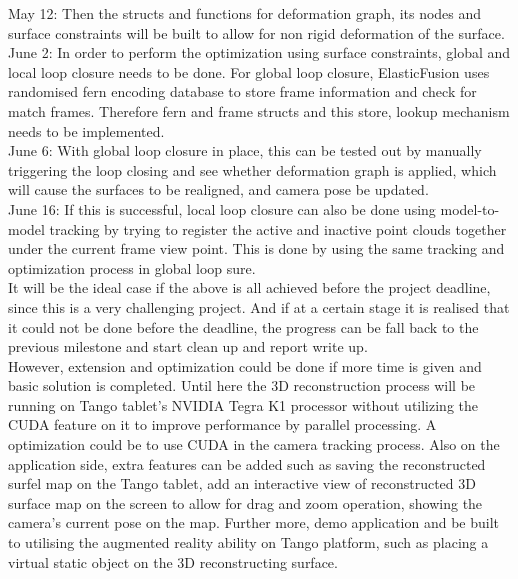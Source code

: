 \documentclass[12pt,twoside]{article}
\begin{document}
May 12: Then the structs and functions for deformation graph, its nodes and surface constraints will be built to allow for non rigid deformation of the surface.\\

June 2: In order to perform the optimization using surface constraints, global and local loop closure needs to be done. For global loop closure, ElasticFusion\cite{whelan2015elasticfusion} uses randomised fern encoding database to store frame information and check for match frames. Therefore fern and frame structs and this store, lookup mechanism needs to be implemented.\\

June 6: With global loop closure in place, this can be tested out by manually triggering the loop closing and see whether deformation graph is applied, which will cause the surfaces to be realigned, and camera pose be updated.\\

June 16: If this is successful, local loop closure can also be done using model-to-model tracking by trying to register the active and inactive point clouds together under the current frame view point. This is done by using the same tracking and optimization process in global loop sure.\\

It will be the ideal case if the above is all achieved before the project deadline, since this is a very challenging project. And if at a certain stage it is realised that it could not be done before the deadline, the progress can be fall back to the previous milestone and start clean up and report write up.\\ 

However, extension and optimization could be done if more time is given and basic solution is completed. Until here the 3D reconstruction process will be running on Tango tablet's NVIDIA Tegra K1 processor without utilizing the CUDA feature on it to improve performance by parallel processing. A optimization could be to use CUDA in the camera tracking process. Also on the application side, extra features can be added such as saving the reconstructed surfel map on the Tango tablet, add an interactive view of reconstructed 3D surface map on the screen to allow for drag and zoom operation, showing the camera's current pose on the map. Further more, demo application and be built to utilising the augmented reality ability on Tango platform, such as placing a virtual static object on the 3D reconstructing surface.
\end{document}
